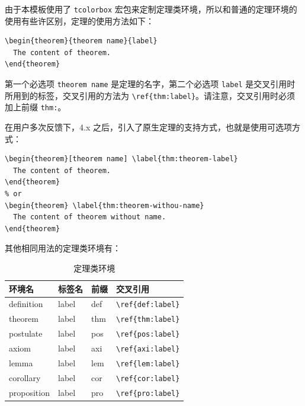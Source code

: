 \documentclass[lang=cn,10pt]{elegantbook}
\begin{document}
由于本模板使用了 \lstinline{tcolorbox} 宏包来定制定理类环境，所以和普通的定理环境的使用有些许区别，定理的使用方法如下：
\begin{lstlisting}
\begin{theorem}{theorem name}{label}
  The content of theorem.
\end{theorem}
\end{lstlisting}

第一个必选项 \lstinline{theorem name} 是定理的名字，第二个必选项 \lstinline{label} 是交叉引用时所用到的标签，交叉引用的方法为 \verb|\ref{thm:label}|。请注意，交叉引用时必须加上前缀 \lstinline{thm:}。

在用户多次反馈下，4.x 之后，引入了原生定理的支持方式，也就是使用可选项方式：

\begin{lstlisting}
\begin{theorem}[theorem name] \label{thm:theorem-label}
  The content of theorem.
\end{theorem}
% or 
\begin{theorem} \label{thm:theorem-withou-name}
  The content of theorem without name.
\end{theorem}
\end{lstlisting}

其他相同用法的定理类环境有：

\begin{table}[htbp]
   \centering
   \caption{定理类环境}
     \begin{tabular}{llll}
     \toprule
     环境名 & 标签名 & 前缀 & 交叉引用 \\
     \midrule
     definition & label & def   & \lstinline|\ref{def:label}| \\
     theorem & label & thm   & \lstinline|\ref{thm:label}| \\
     postulate & label & pos & \lstinline|\ref{pos:label}| \\
     axiom & label & axi & \lstinline|\ref{axi:label}|\\
     lemma & label & lem   & \lstinline|\ref{lem:label}| \\
     corollary & label & cor   & \lstinline|\ref{cor:label}| \\
     proposition & label & pro   & \lstinline|\ref{pro:label}| \\
     \bottomrule
     \end{tabular}%
   \label{tab:theorem-class}%
 \end{table}%
 
\end{document}
